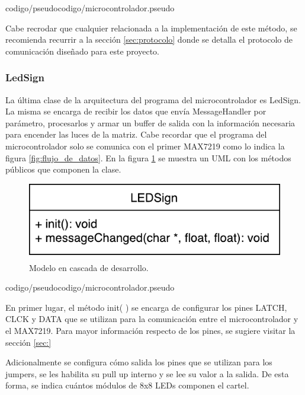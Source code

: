 
{codigo/pseudocodigo/microcontrolador.pseudo}

Cabe recrodar que cualquier relacionada a la implementación de este método, se recomienda recurrir a la sección \ref{sec:protocolo} donde se detalla el protocolo de comunicación diseñado para este proyecto.



\subsubsection{LedSign}

La última clase de la arquitectura del programa del microcontrolador es LedSign.
La misma se encarga de recibir los datos que envía MessageHandler por parámetro, procesarlos y armar un buffer de salida con la información necesaria para encender las luces de la matriz.
Cabe recordar que el programa del microcontrolador solo se comunica con el primer MAX7219 como lo indica la figura \ref{fig:flujo_de_datos}.
En la figura \ref{uml:ledSign} se muestra un UML con los métodos públicos que componen la clase.

\begin{figure}[!ht]
	\centering
	\includegraphics[width=0.8\linewidth]{imagenes/uml/LEDSign.pdf}
	\caption{Modelo en cascada de desarrollo.}
	\label{uml:ledSign}
\end{figure}


{codigo/pseudocodigo/microcontrolador.pseudo}

En primer lugar, el método init( ) se encarga de configurar los pines LATCH, CLCK y DATA que se utilizan para la comunicación entre el microcontrolador y el MAX7219.
Para mayor información respecto de los pines, se sugiere visitar la sección \ref{sec:} %

Adicionalmente se configura cómo salida los pines que se utilizan para los jumpers, se les habilita su pull up interno y se lee su valor a la salida.
De esta forma, se indica cuántos módulos de 8x8 LEDs componen el cartel.

